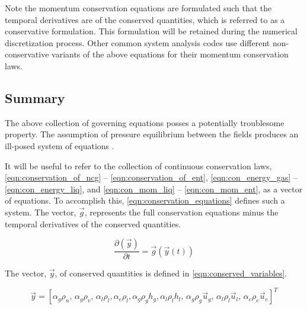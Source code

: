 Note the momentum conservation equations are formulated such that the temporal derivatives are of the conserved quantities, which is referred to as a conservative formulation.
This formulation will be retained during the numerical discretization process.
Other common system analysis codes \cite{TRACE, RELAP} use different non-conservative variants of the above equations for their momentum conservation laws.

\subsection{Summary}
\label{subsect:summary}


The above collection of governing equations posses a potentially troublesome property.
The assumption of pressure equilibrium between the fields produces an ill-posed system of equations \cite{Ransom1984}.


It will be useful to refer to the collection of continuous conservation laws, \eqref{eqn:conservation_of_ncg} -- \eqref{eqn:conservation_of_ent}, \eqref{eqn:con_energy_gas} -- \eqref{eqn:con_energy_liq}, and \eqref{eqn:con_mom_liq} -- \eqref{eqn:con_mom_ent}, as a vector of equations.
To accomplish this, \eqref{eqn:conservation_equations} defines such a system.
The vector, $\vec{g}$, represents the full conservation equations minus the temporal derivatives of the conserved quantities.

\begin{equation}
\label{eqn:conservation_equations}
\frac{\partial \left( \vec{y} \right)}{\partial t} = \vec{g}(\vec{y}(t))
\end{equation}

The vector, $\vec{y}$, of conserved quantities is defined in \eqref{eqn:conserved_variables}.

\begin{equation}
\label{eqn:conserved_variables}
\vec{y} = [\alpha_g \rho_n,\, \alpha_g \rho_v,\, \alpha_l \rho_l, \alpha_e \rho_l, \alpha_g \rho_g h_g, \alpha_l \rho_l h_l,\, \alpha_g \rho_g \vec{u}_g,\, \alpha_l \rho_l \vec{u}_l,\, \alpha_e \rho_e \vec{u}_e]^{T}
\end{equation}

